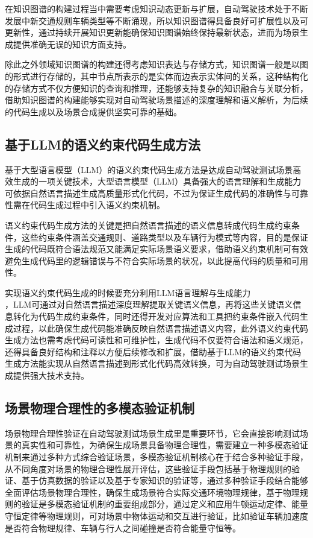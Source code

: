 在知识图谱的构建过程当中需要考虑知识动态更新与扩展\cite{Yang2020SurfelGAN}，自动驾驶技术处于不断发展中新交通规则车辆类型等不断涌现，所以知识图谱得具备良好可扩展性以及可更新性，通过持续开展知识更新能确保知识图谱始终保持最新状态，进而为场景生成提供准确无误的知识方面支持。

除此之外领域知识图谱的构建还得考虑知识表达与存储方式，知识图谱一般是以图的形式进行存储的\cite{Yao2022React}，其中节点所表示的是实体而边表示实体间的关系，这种结构化的存储方式不仅方便知识的查询和推理，还能够支持复杂的知识融合与关联分析，借助知识图谱的构建能够实现对自动驾驶场景描述的深度理解和语义解析，为后续的代码生成以及场景合成提供坚实可靠的基础。

\subsection{基于LLM的语义约束代码生成方法}
基于大型语言模型（LLM）的语义约束代码生成方法是达成自动驾驶测试场景高效生成的一项关键技术，大型语言模型（LLM）具备强大的语言理解和生成能力可依据自然语言描述生成高质量形式化代码，不过为保证生成代码的准确性与可靠性需在代码生成过程中引入语义约束机制\cite{Zhang2023CAT}。

语义约束代码生成方法的关键是把自然语言描述的语义信息转成代码生成约束条件，这些约束条件涵盖交通规则、道路类型以及车辆行为模式等内容，目的是保证生成的代码既符合语法规范又能满足实际场景语义要求\cite{Zhang2022AdversarialRobustness}，借助语义约束机制可有效避免生成代码里的逻辑错误与不符合实际场景的状况，以此提高代码的质量和可用性。

实现语义约束代码生成的时候要充分利用LLM语言理解与生成能力\\ \cite{Zheng2023JudgingLLM}，LLM可通过对自然语言描述深度理解提取关键语义信息，再将这些关键语义信息转化为代码生成约束条件，同时还得开发对应算法和工具把约束条件嵌入代码生成过程，以此确保生成代码能准确反映自然语言描述语义内容，此外语义约束代码生成方法也需考虑代码可读性和可维护性，生成代码不仅要符合语法和语义规范，还得具备良好结构和注释以方便后续修改和扩展，借助基于LLM的语义约束代码生成方法能实现从自然语言描述到形式化代码高效转换\cite{zhong2023language}，可为自动驾驶测试场景生成提供强大技术支持。

\subsection{场景物理合理性的多模态验证机制}
场景物理合理性验证在自动驾驶测试场景生成里是重要环节\cite{zhao2025key}，它会直接影响测试场景的真实性和可靠性，为确保生成场景具备物理合理性，需要建立一种多模态验证机制来通过多种方式综合验证场景，多模态验证机制核心在于结合多种验证手段，从不同角度对场景的物理合理性展开评估，这些验证手段包括基于物理规则的验证、基于仿真数据的验证以及基于专家知识的验证等，通过多种验证手段结合能够全面评估场景物理合理性，确保生成场景符合实际交通环境物理规律\cite{Yao2022React}，基于物理规则的验证是多模态验证机制的重要组成部分，通过定义和应用牛顿运动定律、能量守恒定律等物理规则，可对场景中物体运动和交互进行验证，比如验证车辆加速度是否符合物理规律、车辆与行人之间碰撞是否符合能量守恒等。

